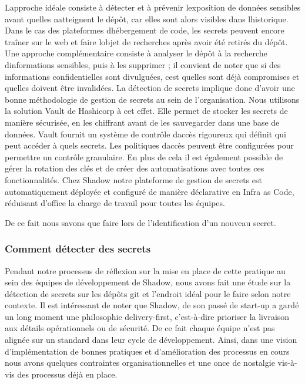 \documentclass[
  11pt,
  a4paper,
  krantz2,
  11pt,
  oneside]{krantz}
\begin{document}
L\textquotesingle approche idéale consiste à détecter et à prévenir l\textquotesingle exposition de données sensibles avant qu\textquotesingle elles n\textquotesingle atteignent le dépôt, car elles sont alors visibles dans l\textquotesingle historique. Dans le cas des plateformes d\textquotesingle hébergement de code, les secrets peuvent encore traîner sur le web et faire l\textquotesingle objet de recherches après avoir été retirés du dépôt. Une approche complémentaire consiste à analyser le dépôt à la recherche d\textquotesingle informations sensibles, puis à les supprimer ; il convient de noter que si des informations confidentielles sont divulguées, c\textquotesingle est qu\textquotesingle elles sont déjà compromises et qu\textquotesingle elles doivent être invalidées. La détection de secrets implique donc d'avoir une bonne méthodologie de gestion de secrets au sein de l'organisation. Nous utilisons la solution Vault de Hashicorp à cet effet. Elle permet de stocker les secrets de manière sécurisée, en les chiffrant avant de les sauvegarder dans une base de données. Vault fournit un système de contrôle d\textquotesingle accès rigoureux qui définit qui peut accéder à quels secrets. Les politiques d\textquotesingle accès peuvent être configurées pour permettre un contrôle granulaire. En plus de cela il est également possible de gérer la rotation des clés et de créer des automatisations avec toutes ces fonctionnalités. Chez Shadow notre plateforme de gestion de secrets est automatiquement déployée et configuré de manière déclarative en Infra as Code, réduisant d'office la charge de travail pour toutes les équipes.

De ce fait nous savons que faire lors de l'identification d'un nouveau secret.

\subsubsection{Comment détecter des secrets}\label{comment-duxe9tecter-des-secrets}

Pendant notre processus de réflexion sur la mise en place de cette pratique au sein des équipes de développement de Shadow, nous avons fait une étude sur la détection de secrets sur les dépôts git et l'endroit idéal pour le faire selon notre contexte. Il est intéressant de noter que Shadow, de son passé de start-up a gardé un long moment une philosophie delivery-first, c'est-à-dire prioriser la livraison aux détails opérationnels ou de sécurité. De ce fait chaque équipe n'est pas alignée sur un standard dans leur cycle de développement. Ainsi, dans une vision d'implémentation de bonnes pratiques et d'amélioration des processus en cours nous avons quelques contraintes organisationnelles et une once de nostalgie vis-à-vis des processus déjà en place.
\end{document}

